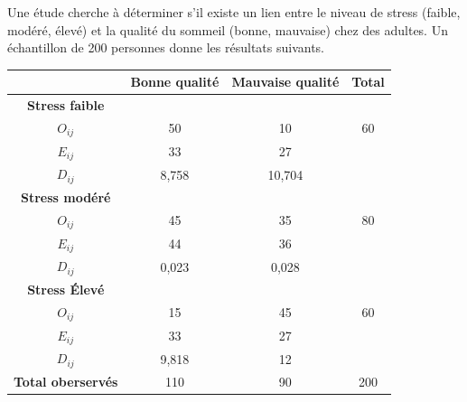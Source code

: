 \begin{questions}
\begin{parts}
\end{parts}

\pageblanche
\question Une étude cherche à déterminer s'il existe un lien entre le niveau de stress (faible, modéré, élevé) et la qualité du sommeil (bonne, mauvaise) chez des adultes. Un échantillon de 200 personnes donne les résultats suivants.

\begin{center}
\begin{tabular}{c|cc|c}
 & \textbf{Bonne qualité} & \textbf{Mauvaise qualité} & \textbf{Total}\\
\hline
\textbf{Stress faible} & & &\\
$O_{ij}$ & 50 & 10 & 60\\
$E_{ij}$ & 33 & 27& \\
$D_{ij}$ & 8,758 & 10,704 \\
\hline
\textbf{Stress modéré} & & &\\
$O_{ij}$  & 45 & 35 & 80\\
$E_{ij}$ & 44 & 36\\
$D_{ij}$ & 0,023 & 0,028 \\
\hline
\textbf{Stress Élevé} & & &\\
$O_{ij}$  & 15 & 45 & 60\\
$E_{ij}$ & 33 & 27\\
$D_{ij}$ & 9,818 & 12 \\
\hline
\hline
\textbf{Total oberservés} & 110 & 90 & 200
\end{tabular}
\end{center}

\end{questions}
